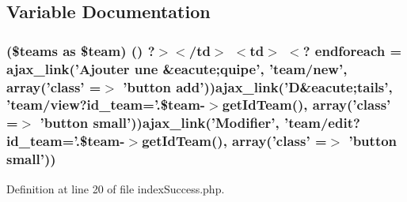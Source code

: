 \subsection{Variable Documentation}
\hypertarget{backend_2modules_2team_2templates_2index_success_8php_a1cbcd663ddebc10908570169f6e8515f}{
\subsubsection[{endforeach}]{ (\$teams as \$team) () ?$>$$<$/td$>$ $<$td$>$ $<$? endforeach = ajax\-\_\-link('Ajouter une \&{\bf eacute};quipe', 'team/new', array('{\bf class}' =$>$ 'button add'))ajax\-\_\-link('D\&{\bf eacute};tails', 'team/view?id\-\_\-team='.\$team-\/$>$get\-Id\-Team(), array('{\bf class}' =$>$ 'button small'))ajax\-\_\-link('Modifier', 'team/edit?id\-\_\-team='.\$team-\/$>$get\-Id\-Team(), array('{\bf class}' =$>$ 'button small'))}}\label{backend_2modules_2team_2templates_2index_success_8php_a1cbcd663ddebc10908570169f6e8515f}


Definition at line 20 of file index\-Success.\-php.

